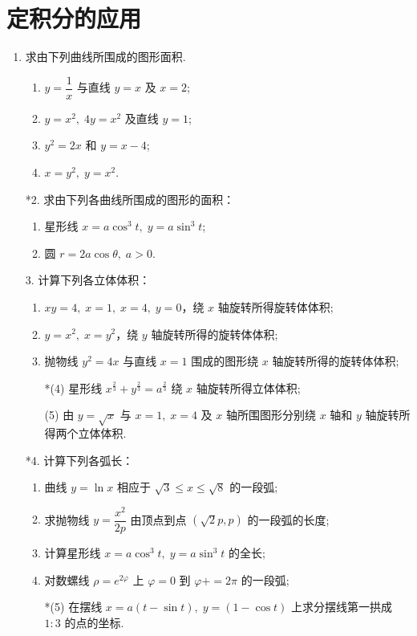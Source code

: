 \section{定积分的应用}

\begin{enumerate}\setlength{\itemsep}{7pt}
    \item 求由下列曲线所围成的图形面积.
    \begin{enumerate}[(1)]\setlength{\itemsep}{5pt}\setlength{\topsep}{15pt}
        \item $y=\dfrac{1}{x}$ 与直线 $y=x$ 及 $x=2$;
        \item $y=x^2,\;4y=x^2$ 及直线 $y=1$;
        \item $y^2=2x$ 和 $y=x-4$;
        \item $x=y^2,\;y=x^2$.
    \end{enumerate}

    \item[*2.] 求由下列各曲线所围成的图形的面积：
    \begin{enumerate}[(1)]\setlength{\itemsep}{5pt}\setlength{\topsep}{15pt}
        \item 星形线 $x=a\cos^3t,\;y=a\sin^3t$;
        \item 圆 $r=2a\cos \theta,\;a>0$.
    \end{enumerate}

    \item[3.] 计算下列各立体体积：
    \begin{enumerate}[(1)]\setlength{\itemsep}{5pt}\setlength{\topsep}{15pt}
        \item $xy=4,\;x=1,\;x=4,\;y=0$，绕 $x$ 轴旋转所得旋转体体积;
        \item $y=x^2,\;x=y^2$，绕 $y$ 轴旋转所得的旋转体体积;
        \item 抛物线 $y^2=4x$ 与直线 $x=1$ 围成的图形绕 $x$ 轴旋转所得的旋转体体积;
        \item[*(4)] 星形线 $x^{\frac{2}{3}}+y^{\frac{2}{3}}=a^{\frac{2}{3}}$ 绕 $x$ 轴旋转所得立体体积;
        \item[(5)] 由 $y=\sqrt{x}$ 与 $x=1,\;x=4$ 及 $x$ 轴所围图形分别绕 $x$ 轴和 $y$ 轴旋转所得两个立体体积.
    \end{enumerate}

    \item[*4.] 计算下列各弧长：
    \begin{enumerate}[(1)]\setlength{\itemsep}{5pt}\setlength{\topsep}{15pt}
        \item 曲线 $y=\ln x$ 相应于 $\sqrt{3}\leqslant x\leqslant \sqrt{8}$ 的一段弧;
        \item 求抛物线 $y=\dfrac{x^2}{2p}$ 由顶点到点 $(\sqrt{2}p,p)$ 的一段弧的长度;
        \item 计算星形线 $x=a\cos^3t,\;y=a\sin^3t$ 的全长;
        \item 对数螺线 $\rho=e^{2\varphi}$ 上 $\varphi=0$ 到 $\varphi+=2\pi$ 的一段弧;
        \item[*(5)] 在摆线 $x=a(t-\sin t),\;y=(1-\cos t)$ 上求分摆线第一拱成 $1:3$ 的点的坐标.
    \end{enumerate}


\end{enumerate}
